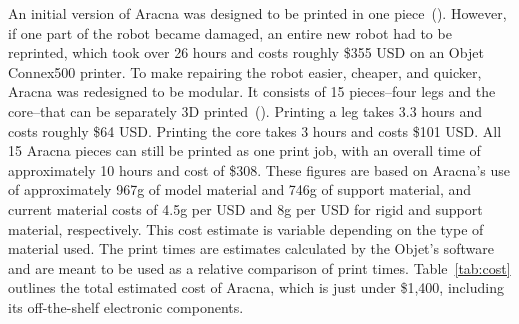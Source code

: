 \documentclass[letterpaper]{article}
\begin{document}
An initial version of Aracna was designed to be printed in one piece~(). However, if one part of the robot became damaged, an entire new robot had to be reprinted, which took over 26 hours and costs roughly \$355 USD on an Objet Connex500 printer. To make repairing the robot easier, cheaper, and quicker, Aracna was redesigned to be modular. It consists of 15 pieces--four legs and the core--that can be separately 3D printed~(). Printing a leg takes 3.3 hours and costs roughly \$64 USD. Printing the core takes 3 hours and costs \$101 USD. All 15 Aracna pieces can still be printed as one print job, with an overall time of approximately 10 hours and cost of \$308. These figures are based on Aracna's use of  approximately 967g of model material and 746g of support material, and current material costs of 4.5g per USD and 8g per USD for rigid and support material, respectively. This cost estimate is variable depending on the type of material used. The print times are estimates calculated by the Objet's software and are meant to be used as a relative comparison of print times. Table~\ref{tab:cost} outlines the total estimated cost of Aracna, which is just under \$1,400, including its off-the-shelf electronic components. 




\end{document}
